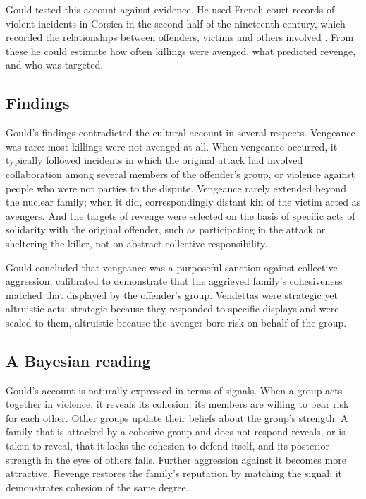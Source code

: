 Gould tested this account against evidence. He used French court records of violent incidents in Corsica in the second half of the nineteenth century, which recorded the relationships between offenders, victims and others involved \citep{gould2000}. From these he could estimate how often killings were avenged, what predicted revenge, and who was targeted.

\subsection{Findings}

Gould's findings contradicted the cultural account in several respects. Vengeance was rare: most killings were not avenged at all. When vengeance occurred, it typically followed incidents in which the original attack had involved collaboration among several members of the offender's group, or violence against people who were not parties to the dispute. Vengeance rarely extended beyond the nuclear family; when it did, correspondingly distant kin of the victim acted as avengers. And the targets of revenge were selected on the basis of specific acts of solidarity with the original offender, such as participating in the attack or sheltering the killer, not on abstract collective responsibility.

Gould concluded that vengeance was a purposeful sanction against collective aggression, calibrated to demonstrate that the aggrieved family's cohesiveness matched that displayed by the offender's group. Vendettas were strategic yet altruistic acts: strategic because they responded to specific displays and were scaled to them, altruistic because the avenger bore risk on behalf of the group.

\subsection{A Bayesian reading}

Gould's account is naturally expressed in terms of signals. When a group acts together in violence, it reveals its cohesion: its members are willing to bear risk for each other. Other groups update their beliefs about the group's strength. A family that is attacked by a cohesive group and does not respond reveals, or is taken to reveal, that it lacks the cohesion to defend itself, and its posterior strength in the eyes of others falls. Further aggression against it becomes more attractive. Revenge restores the family's reputation by matching the signal: it demonstrates cohesion of the same degree.

